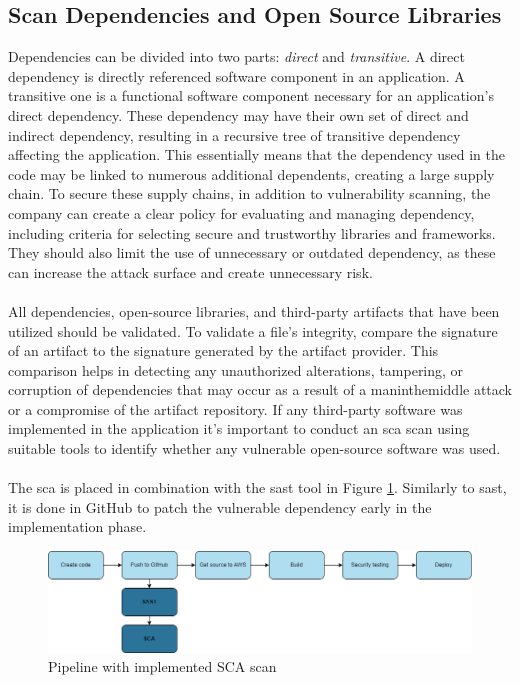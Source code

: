 \subsection{Scan Dependencies and Open Source Libraries}
\label{Scan Dependencies and Open Source Libraries}
Dependencies can be divided into two parts: \textit{direct} and \textit{transitive}. A direct dependency is directly referenced software component in an application. A transitive one is a functional software component necessary for an application's direct \gls{dependency}. These \gls{dependency} may have their own set of direct and indirect \gls{dependency}, resulting in a recursive tree of transitive \gls{dependency} affecting the application. This essentially means that the \gls{dependency} used in the code may be linked to numerous additional dependents, creating a large supply chain. To secure these supply chains, in addition to vulnerability scanning, the company can create a clear policy for evaluating and managing \gls{dependency}, including criteria for selecting secure and trustworthy libraries and frameworks. They should also limit the use of unnecessary or outdated \gls{dependency}, as these can increase the attack surface and create unnecessary risk. \cite{googledependency}
\\~\\
All dependencies, open-source libraries, and third-party \gls{artifact}s that have been utilized should be validated. To validate a file's integrity, compare the signature of an artifact to the signature generated by the artifact provider. This comparison helps in detecting any unauthorized alterations, tampering, or corruption of dependencies that may occur as a result of a \gls{maninthemiddle} attack or a compromise of the artifact repository. If any third-party software was implemented in the application it's important to conduct an \acrshort{sca} scan using suitable tools to identify whether any vulnerable open-source software was used. \cite{bestpracticeSupplyChain}
\\~\\
The \acrshort{sca} is placed in combination with the \acrshort{sast} tool in Figure \ref{fig: Pipeline with implemented SCA scan}. Similarly to \acrshort{sast}, it is done in GitHub to patch the vulnerable \gls{dependency} early in the implementation phase.

\vspace{2mm}
\begin{figure}[H]
    \centering
    \includegraphics[width=0.8\columnwidth]{Images/pipeline3.png}
    \caption{Pipeline with implemented SCA scan}
    \label{fig: Pipeline with implemented SCA scan}
\end{figure}

